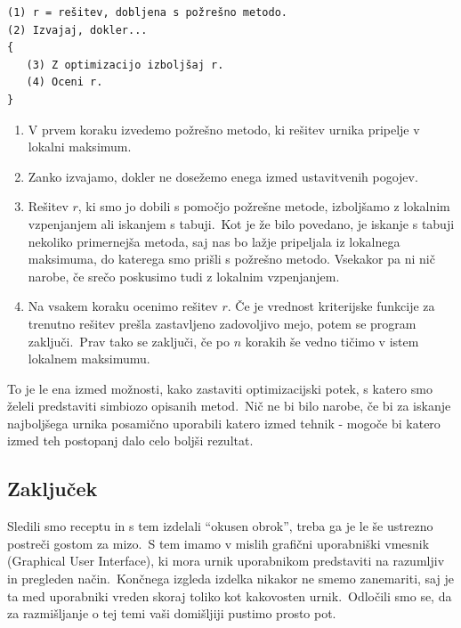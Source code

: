 \documentclass[a4paper,10pt]{article}
\begin{document}
\begin{verbatim}
(1) r = rešitev, dobljena s požrešno metodo.
(2) Izvajaj, dokler...
{
   (3) Z optimizacijo izboljšaj r.
   (4) Oceni r.
}
\end{verbatim}

\begin{enumerate}

  \item V prvem koraku izvedemo požrešno metodo, ki rešitev urnika pripelje v lokalni maksimum.

  \item Zanko izvajamo, dokler ne dosežemo enega izmed ustavitvenih pogojev.

   \item Rešitev $r$, ki smo jo dobili s pomočjo požrešne metode, izboljšamo z lokalnim vzpenjanjem
   ali iskanjem s tabuji.\ Kot je že bilo povedano, je iskanje s tabuji nekoliko primernejša metoda,
   saj nas bo lažje pripeljala iz lokalnega maksimuma, do katerega smo prišli s požrešno metodo.
   Vsekakor pa ni nič narobe, če srečo poskusimo tudi z lokalnim vzpenjanjem.

   \item Na vsakem koraku ocenimo rešitev $r$. Če je vrednost kriterijske funkcije
   za trenutno rešitev prešla zastavljeno zadovoljivo mejo, potem se program zaključi.\ Prav tako
   se zaključi, če po $n$ korakih še vedno tičimo v istem lokalnem maksimumu.
   \end{enumerate}

To je le ena izmed možnosti, kako zastaviti optimizacijski potek, s katero smo želeli predstaviti
simbiozo opisanih metod.\ Nič ne bi bilo narobe, če bi za iskanje najboljšega urnika posamično
uporabili katero izmed tehnik - mogoče bi katero izmed teh postopanj dalo celo boljši rezultat.

\subsection{Zaključek}

Sledili smo receptu in s tem izdelali ``okusen obrok'', treba ga je le še ustrezno postreči
gostom za mizo.\ S tem imamo v mislih grafični uporabniški vmesnik (Graphical
User Interface), ki mora urnik uporabnikom predstaviti na razumljiv in
pregleden način.\ Končnega izgleda izdelka nikakor ne smemo zanemariti, saj je ta med uporabniki
vreden skoraj toliko kot kakovosten urnik.\ Odločili smo se, da za razmišljanje o tej temi vaši
domišljiji pustimo prosto pot.
\end{document}
